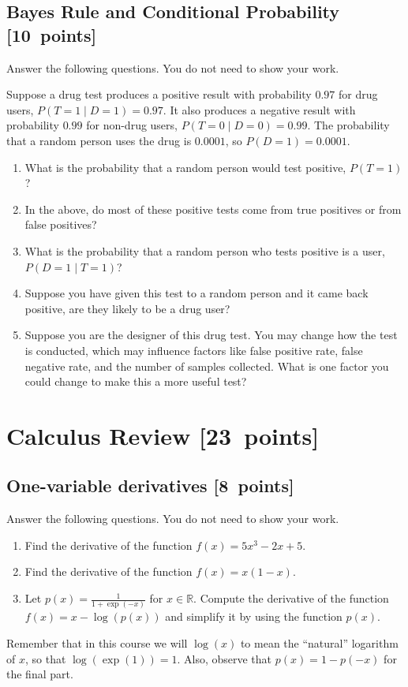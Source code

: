 \documentclass{article}
\newcommand{\blu}[1]{{\textcolor{blu}{#1}}}
\let\ask\blu
\newcommand\pts[1]{\textcolor{pointscolour}{[#1~points]}}
\def\R{\mathbb{R}}
\begin{document}
  \subsection{Bayes Rule and Conditional Probability \pts{10}}

  \ask{Answer the following questions.} You do not need to show your work.

  Suppose a drug test produces a positive result with probability $0.97$ for drug users, $P(T=1 \mid D=1)=0.97$. It also produces a negative result with probability $0.99$ for non-drug users, $P(T=0 \mid D=0)=0.99$. The probability that a random person uses the drug is $0.0001$, so $P(D=1)=0.0001$.

  \begin{enumerate}
  \item What is the probability that a random person would test positive, $P(T=1)$?
  \item In the above, do most of these positive tests come from true positives or from false positives?
  \item What is the probability that a random person who tests positive is a user, $P(D=1 \mid T=1)$?
  \item Suppose you have given this test to a random person and it came back positive, are they likely to be a drug user?
  \item Suppose you are the designer of this drug test. You may change how the test is conducted, which may influence factors like false positive rate, false negative rate, and the number of samples collected. What is one factor you could change to make this a more useful test?
  \end{enumerate}


  \clearpage\section{Calculus Review \pts{23}}



  \subsection{One-variable derivatives \pts{8}}
  \label{sub.one.var}

  \ask{Answer the following questions.} You do not need to show your work.

  \begin{enumerate}
  \item Find the derivative of the function $f(x) = 5x^3 -2x + 5$.
  \item Find the derivative of the function $f(x) = x(1-x)$.
  \item Let $p(x) = \frac{1}{1+\exp(-x)}$ for $x \in \R$. Compute the derivative of the function $f(x) = x-\log(p(x))$ and simplify it by using the function $p(x)$.
  \end{enumerate}
  Remember that in this course we will $\log(x)$ to mean the ``natural'' logarithm of $x$, so that $\log(\exp(1)) = 1$. Also, observe that $p(x) = 1-p(-x)$ for the final part.
\end{document}
